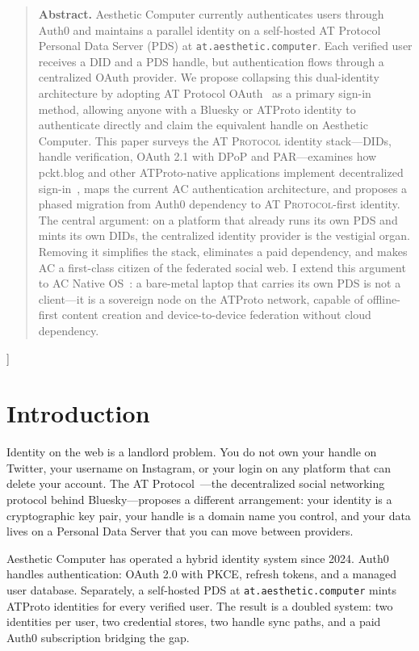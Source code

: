 \documentclass[10pt,letterpaper,twocolumn]{article}
\newcommand{\atproto}{\textsc{AT Protocol}}
\begin{document}
{\begin{quote}
\small\noindent\textbf{Abstract.}
Aesthetic Computer currently authenticates users through Auth0 and maintains a parallel identity on a self-hosted AT Protocol Personal Data Server (PDS) at \texttt{at.aesthetic.computer}. Each verified user receives a DID and a PDS handle, but authentication flows through a centralized OAuth provider. We propose collapsing this dual-identity architecture by adopting AT Protocol OAuth~\citep{atproto2024oauth} as a primary sign-in method, allowing anyone with a Bluesky or ATProto identity to authenticate directly and claim the equivalent handle on Aesthetic Computer. This paper surveys the \atproto{} identity stack---DIDs, handle verification, OAuth 2.1 with DPoP and PAR---examines how pckt.blog and other ATProto-native applications implement decentralized sign-in~\citep{pcktblog2025}, maps the current AC authentication architecture, and proposes a phased migration from Auth0 dependency to \atproto{}-first identity. The central argument: on a platform that already runs its own PDS and mints its own DIDs, the centralized identity provider is the vestigial organ. Removing it simplifies the stack, eliminates a paid dependency, and makes AC a first-class citizen of the federated social web. I extend this argument to AC Native OS~\citep{scudder2026os}: a bare-metal laptop that carries its own PDS is not a client---it is a sovereign node on the ATProto network, capable of offline-first content creation and device-to-device federation without cloud dependency.
\end{quote}
\vspace{0.5em}
}]


\section{Introduction}

Identity on the web is a landlord problem. You do not own your handle on Twitter, your username on Instagram, or your login on any platform that can delete your account. The AT Protocol~\citep{atproto2024spec}---the decentralized social networking protocol behind Bluesky---proposes a different arrangement: your identity is a cryptographic key pair, your handle is a domain name you control, and your data lives on a Personal Data Server that you can move between providers.

Aesthetic Computer has operated a hybrid identity system since 2024. Auth0~\citep{auth0spa} handles authentication: OAuth 2.0 with PKCE, refresh tokens, and a managed user database. Separately, a self-hosted PDS at \texttt{at.aesthetic.computer} mints ATProto identities for every verified user. The result is a doubled system: two identities per user, two credential stores, two handle sync paths, and a paid Auth0 subscription bridging the gap.
\end{document}

